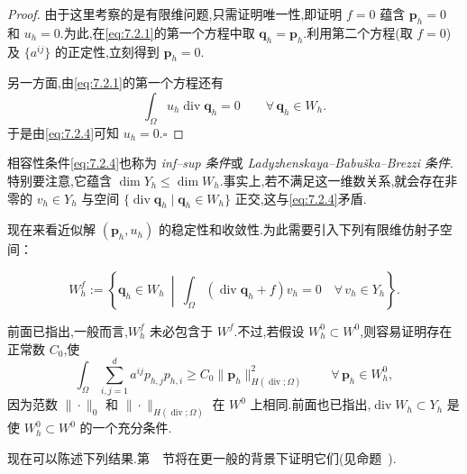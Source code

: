 \begin{proof}
由于这里考察的是有限维问题,只需证明唯一性,即证明 \(f=0\) 蕴含 \(\boldsymbol{p}_h=0\) 和 \(u_h=0\).为此,在\eqref{eq:7.2.1}的第一个方程中取 \(\boldsymbol{q}_h=\boldsymbol{p}_h\).利用第二个方程(取 \(f=0\))及 \(\{a^{ij}\}\) 的正定性,立刻得到 \(\boldsymbol{p}_h=0\).

另一方面,由\eqref{eq:7.2.1}的第一个方程还有
\[
  \int_\Omega u_h\operatorname{div}\boldsymbol{q}_h=0\qquad\forall\,\boldsymbol{q}_h\in W_h.
\]
于是由\eqref{eq:7.2.4}可知 \(u_h=0\).\hfill\(\square\)
\end{proof}

相容性条件\eqref{eq:7.2.4}也称为 \emph{inf--sup 条件}或 \emph{Ladyzhenskaya--Babuška--Brezzi 条件}.特别要注意,它蕴含 \(\dim Y_h\le\dim W_h\).事实上,若不满足这一维数关系,就会存在非零的 \(v_h\in Y_h\) 与空间 \(\{\operatorname{div}\boldsymbol{q}_h\mid\boldsymbol{q}_h\in W_h\}\) 正交,这与\eqref{eq:7.2.4}矛盾.

现在来看近似解 \((\boldsymbol{p}_h,u_h)\) 的稳定性和收敛性.为此需要引入下列有限维仿射子空间：
\begin{definition*}
\begin{equation}\label{eq:7.2.5}
  W_h^f:=\left\{\boldsymbol{q}_h\in W_h\ \middle|\
     \int_\Omega(\operatorname{div}\boldsymbol{q}_h+f)v_h=0
     \quad\forall\,v_h\in Y_h\right\}.
\end{equation}
\end{definition*}
前面已指出,一般而言,\(W_h^f\) 未必包含于 \(W^f\).不过,若假设 \(W_h^0\subset W^0\),则容易证明存在正常数 \(C_0\),使
\begin{equation}\label{eq:7.2.6}
  \int_\Omega\sum_{i,j=1}^d a^{ij}p_{h,j}p_{h,i}
    \ge C_0\|\boldsymbol{p}_h\|_{H(\operatorname{div};\Omega)}^2
      \qquad\forall\,\boldsymbol{p}_h\in W_h^0,
\end{equation}
因为范数 \(\|\cdot\|_0\) 和 \(\|\cdot\|_{H(\operatorname{div};\Omega)}\) 在 \(W^0\) 上相同.前面也已指出,\(\operatorname{div}W_h\subset Y_h\) 是使 \(W_h^0\subset W^0\) 的一个充分条件.

现在可以陈述下列结果.第~~节将在更一般的背景下证明它们(见命题~).

